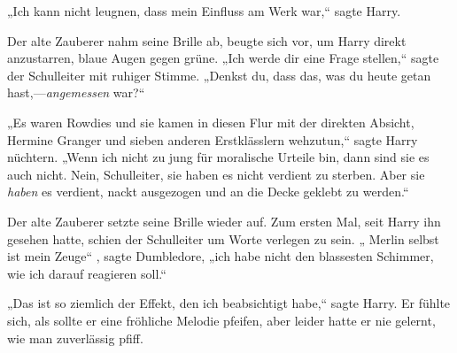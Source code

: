 „Ich kann nicht leugnen, dass mein Einfluss am Werk war,“ sagte Harry.

Der alte Zauberer nahm seine Brille ab, beugte sich vor, um Harry direkt anzustarren, blaue Augen gegen grüne. „Ich werde dir eine Frage stellen,“ sagte der Schulleiter mit ruhiger Stimme. „Denkst du, dass das, was du heute getan hast,—\emph{angemessen} war?“

„Es waren Rowdies und sie kamen in diesen Flur mit der direkten Absicht, Hermine Granger und sieben anderen Erstklässlern wehzutun,“ sagte Harry nüchtern. „Wenn ich nicht zu jung für moralische Urteile bin, dann sind sie es auch nicht. Nein, Schulleiter, sie haben es nicht verdient zu sterben. Aber sie \emph{haben} es verdient, nackt ausgezogen und an die Decke geklebt zu werden.“

Der alte Zauberer setzte seine Brille wieder auf. Zum ersten Mal, seit Harry ihn gesehen hatte, schien der Schulleiter um Worte verlegen zu sein. „ Merlin selbst ist mein Zeuge“ , sagte Dumbledore, „ich habe nicht den blassesten Schimmer, wie ich darauf reagieren soll.“

„Das ist so ziemlich der Effekt, den ich beabsichtigt habe,“ sagte Harry. Er fühlte sich, als sollte er eine fröhliche Melodie pfeifen, aber leider hatte er nie gelernt, wie man zuverlässig pfiff.

